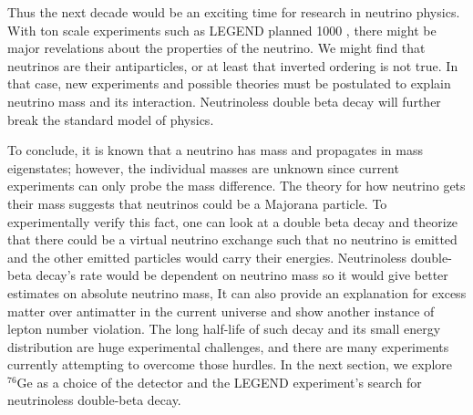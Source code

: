 Thus the next decade would be an exciting time for research in neutrino physics. With ton scale experiments such as LEGEND planned 1000 \cite{legend2017}, there might be major revelations about the properties of the neutrino. We might find that neutrinos are their antiparticles, or at least that inverted ordering is not true. In that case, new experiments and possible theories must be postulated to explain neutrino mass and its interaction. Neutrinoless double beta decay will further break the standard model of physics.

To conclude, it is known that a neutrino has mass and propagates in mass eigenstates; however, the individual masses are unknown since current experiments can only probe the mass difference. The theory for how neutrino gets their mass suggests that neutrinos could be a Majorana particle. To experimentally verify this fact, one can look at a double beta decay and theorize that there could be a virtual neutrino exchange such that no neutrino is emitted and the other emitted particles would carry their energies. Neutrinoless double-beta decay's rate would be dependent on neutrino mass so it would give better estimates on absolute neutrino mass, It can also provide an explanation for excess matter over antimatter in the current universe and show another instance of lepton number violation. The long half-life of such decay and its small energy distribution are huge experimental challenges, and there are many experiments currently attempting to overcome those hurdles. In the next section, we explore ${}^{76}\mathrm{Ge}$ as a choice of the detector and the LEGEND experiment's search for neutrinoless double-beta decay.

